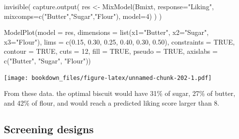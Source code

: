 \documentclass[
]{krantz}
\makeatletter
\newenvironment{Shaded}{\begin{snugshade}}{\end{snugshade}}
\newcommand{\AttributeTok}[1]{\textcolor[rgb]{0.61,0.61,0.61}{#1}}
\newcommand{\ConstantTok}[1]{\textcolor[rgb]{0,0,0}{#1}}
\newcommand{\DecValTok}[1]{\textcolor[rgb]{0.06,0.06,0.06}{#1}}
\newcommand{\FloatTok}[1]{\textcolor[rgb]{0.06,0.06,0.06}{#1}}
\newcommand{\FunctionTok}[1]{\textcolor[rgb]{0,0,0}{#1}}
\newcommand{\NormalTok}[1]{#1}
\newcommand{\OtherTok}[1]{\textcolor[rgb]{0.37,0.37,0.37}{#1}}
\newcommand{\StringTok}[1]{\textcolor[rgb]{0.5,0.5,0.5}{#1}}
\newenvironment{kframe}{%
\medskip{}
\setlength{\fboxsep}{.8em}
 \def\at@end@of@kframe{}%
 \ifinner\ifhmode%
  \def\at@end@of@kframe{\end{minipage}}%
  \begin{minipage}{\columnwidth}%
 \fi\fi%
 \def\FrameCommand##1{\hskip\@totalleftmargin \hskip-\fboxsep
 \colorbox{shadecolor}{##1}\hskip-\fboxsep
     \hskip-\linewidth \hskip-\@totalleftmargin \hskip\columnwidth}%
 \MakeFramed {\advance\hsize-\width
   \@totalleftmargin\z@ \linewidth\hsize
   \@setminipage}}%
 {\par\unskip\endMakeFramed%
 \at@end@of@kframe}
\renewenvironment{Shaded}{\begin{kframe}}{\end{kframe}}
\makeatother
\begin{document}
\begin{Shaded}
\begin{Highlighting}[]
\FunctionTok{invisible}\NormalTok{(}
  \FunctionTok{capture.output}\NormalTok{(}
\NormalTok{    res }\OtherTok{\textless{}{-}} \FunctionTok{MixModel}\NormalTok{(Bmixt, }\AttributeTok{response=}\StringTok{"Liking"}\NormalTok{, }\AttributeTok{mixcomps=}\FunctionTok{c}\NormalTok{(}\StringTok{"Butter"}\NormalTok{,}\StringTok{"Sugar"}\NormalTok{,}\StringTok{"Flour"}\NormalTok{), }\AttributeTok{model=}\DecValTok{4}\NormalTok{)}
\NormalTok{  )}
\NormalTok{)}

\FunctionTok{ModelPlot}\NormalTok{(}\AttributeTok{model =}\NormalTok{ res,}
          \AttributeTok{dimensions =} \FunctionTok{list}\NormalTok{(}\AttributeTok{x1=}\StringTok{"Butter"}\NormalTok{, }\AttributeTok{x2=}\StringTok{"Sugar"}\NormalTok{, }\AttributeTok{x3=}\StringTok{"Flour"}\NormalTok{),}
          \AttributeTok{lims =} \FunctionTok{c}\NormalTok{(}\FloatTok{0.15}\NormalTok{, }\FloatTok{0.30}\NormalTok{, }\FloatTok{0.25}\NormalTok{, }\FloatTok{0.40}\NormalTok{, }\FloatTok{0.30}\NormalTok{, }\FloatTok{0.50}\NormalTok{), }\AttributeTok{constraints =} \ConstantTok{TRUE}\NormalTok{,}
          \AttributeTok{contour =} \ConstantTok{TRUE}\NormalTok{, }\AttributeTok{cuts =} \DecValTok{12}\NormalTok{, }\AttributeTok{fill =} \ConstantTok{TRUE}\NormalTok{, }\AttributeTok{pseudo =} \ConstantTok{TRUE}\NormalTok{,}
          \AttributeTok{axislabs =} \FunctionTok{c}\NormalTok{(}\StringTok{"Butter"}\NormalTok{, }\StringTok{"Sugar"}\NormalTok{, }\StringTok{"Flour"}\NormalTok{))}
\end{Highlighting}
\end{Shaded}

\texttt{[image: bookdown\_files/figure-latex/unnamed-chunk-202-1.pdf]}

From these data. the optimal biscuit would have 31\% of sugar, 27\% of butter, and 42\% of flour, and would reach a predicted liking score larger than 8.

\hypertarget{screening-designs}{%
\subsection{Screening designs}\label{screening-designs}}
\end{document}
